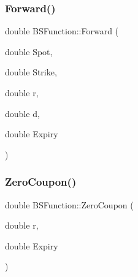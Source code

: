 \hypertarget{namespaceBSFunction_a39b0cb6fa3b178c43df8ffdf4da4e2e3}{}\label{namespaceBSFunction_a39b0cb6fa3b178c43df8ffdf4da4e2e3} 
\subsubsection{\texorpdfstring{Forward()}{Forward()}}
{\footnotesize\ttfamily double B\+S\+Function\+::\+Forward (\begin{DoxyParamCaption}\item[{double}]{Spot,  }\item[{double}]{Strike,  }\item[{double}]{r,  }\item[{double}]{d,  }\item[{double}]{Expiry }\end{DoxyParamCaption})}

\hypertarget{namespaceBSFunction_a8e791280a07aa4c369588c8869127da3}{}\label{namespaceBSFunction_a8e791280a07aa4c369588c8869127da3} 
\subsubsection{\texorpdfstring{Zero\+Coupon()}{ZeroCoupon()}}
{\footnotesize\ttfamily double B\+S\+Function\+::\+Zero\+Coupon (\begin{DoxyParamCaption}\item[{double}]{r,  }\item[{double}]{Expiry }\end{DoxyParamCaption})}

